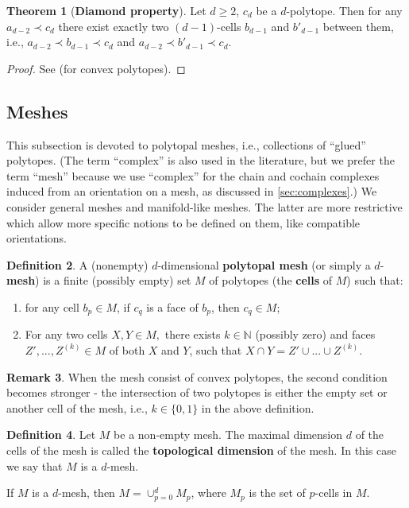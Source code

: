 \documentclass{elsarticle}
\theoremstyle{definition}
\newtheorem{theorem}{Theorem}[section]
\newtheorem{definition}[theorem]{Definition}
\newtheorem{remark}[theorem]{Remark}
\newcommand{\N}{\mathbb{N}} %
\begin{document}
\begin{theorem}[\textbf{Diamond property}]
\label{thm:polytope_diamond_property}
  Let $d \geq 2$, $c_d$ be a $d$-polytope. Then for any $a_{d - 2} \prec c_d$ there exist exactly two $(d - 1)$-cells $b_{d - 1}$ and $b'_{d - 1}$ between them, i.e., $a_{d - 2} \prec b_{d - 1} \prec c_d$ and $a_{d - 2} \prec b'_{d - 1} \prec c_d$.
\end{theorem}
\begin{proof}
  See \cite[Theorem 2.7 (iii)]{ziegler1995lectures} (for convex polytopes).
\end{proof}

\subsection{Meshes}
\label{sec:meshes}
This subsection is devoted to polytopal meshes, i.e., collections of ``glued'' polytopes. (The term ``complex'' is also used in the literature, but we prefer the term ``mesh'' because we use ``complex'' for the chain and cochain complexes induced from an orientation on a mesh, as discussed in \ref{sec:complexes}.) We consider general meshes and manifold-like meshes. The latter are more restrictive which allow more specific notions to be defined on them, like compatible orientations.
\begin{definition}
\label{thm:mesh}
  A (nonempty) $d$-dimensional \textbf{polytopal mesh} (or simply a $d$-\textbf{mesh}) is a finite (possibly empty) set $M$ of polytopes (the \textbf{cells} of $M$) such that:
  \begin{enumerate}
    \item
      for any cell $b_p \in M$, if $c_q$ is a face of $b_p$, then $c_q \in M$;
    \item
      For any two cells $X, Y \in M,$ there exists $k \in \N$ (possibly zero) and faces $Z',...,Z^{(k)} \in M$ of both $X$ and $Y$, such that $X \cap Y = Z' \cup ... \cup Z^{(k)}$.
  \end{enumerate}
\end{definition}
\begin{remark}
  When the mesh consist of convex polytopes, the second condition becomes stronger - the intersection of two polytopes is either the empty set or another cell of the mesh, i.e., $k \in \{0 , 1\}$ in the above definition.
\end{remark}
\begin{definition}
  Let $M$ be a non-empty mesh. The maximal dimension $d$ of the cells of the mesh is called the \textbf{topological dimension} of the mesh. In this case we say that $M$ is a $d$-mesh.
  
  If $M$ is a $d$-mesh, then $M = \cup_{p = 0}^{d} M_p$, where $M_p$ is the set of $p$-cells in $M$.
\end{definition}
\end{document}
